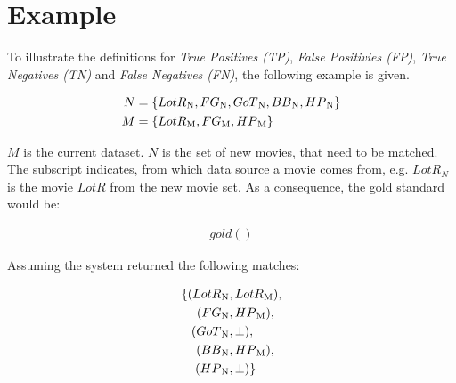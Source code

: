






\section{Example}

To illustrate the definitions for \emph{True Positives (TP)}, \emph{False Positivies (FP)}, \emph{True Negatives (TN)} and \emph{False Negatives (FN)}, the following example is given.

\begin{align*}
N &= \{LotR\textsubscript{N}, FG\textsubscript{N}, GoT\textsubscript{N}, BB\textsubscript{N}, HP\textsubscript{N}\} \\
M &= \{LotR\textsubscript{M}, FG\textsubscript{M}, HP\textsubscript{M}\}
\end{align*}

$M$ is the current dataset. $N$ is the set of new movies, that need to be matched. The subscript indicates, from which data source a movie comes from, e.g. $LotR_N$ is the movie $LotR$ from the new movie set.
As a consequence, the gold standard would be:

\begin{align*}
gold()
\end{align*}

Assuming the system returned the following matches:

\begin{align*}
\{ (LotR\textsubscript{N}&, LotR\textsubscript{M}), \\
(FG\textsubscript{N}&, HP\textsubscript{M}), \\
(GoT\textsubscript{N}&, \mathbf{\bot}), \\
(BB\textsubscript{N}&, HP\textsubscript{M}), \\
(HP\textsubscript{N}&, \mathbf{\bot}) \} \\
\end{align*}

